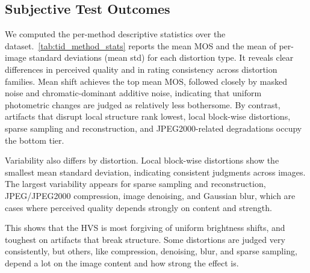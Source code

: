 \subsection{Subjective Test Outcomes}

We computed the per-method descriptive statistics over the dataset.~\autoref{tab:tid_method_stats} reports the mean \acs{MOS} and the mean of per-image standard deviations (mean std) for each distortion type. It reveals clear differences in perceived quality and in rating consistency across distortion families. Mean shift achieves the top mean \acs{MOS}, followed closely by masked noise and chromatic-dominant additive noise, indicating that uniform photometric changes are judged as relatively less bothersome. By contrast, artifacts that disrupt local structure rank lowest, local block-wise distortions, sparse sampling and reconstruction, and \acs{JPEG}2000-related degradations occupy the bottom tier.

Variability also differs by distortion. Local block-wise distortions show the smallest mean standard deviation, indicating consistent judgments across images. The largest variability appears for sparse sampling and reconstruction, \acs{JPEG}/\acs{JPEG}2000 compression, image denoising, and Gaussian blur, which are cases where perceived quality depends strongly on content and strength.

This shows that the \acs{HVS} is most forgiving of uniform brightness shifts, and toughest on artifacts that break structure. Some distortions are judged very consistently, but others, like compression, denoising, blur, and sparse sampling, depend a lot on the image content and how strong the effect is.

